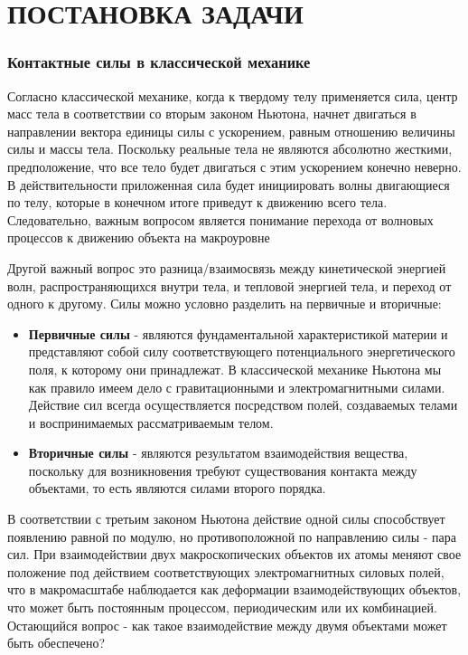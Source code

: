 \newpage
\chapter{ПОСТАНОВКА ЗАДАЧИ}

\subsection*{Контактные силы в классической механике}
Согласно классической механике, когда к твердому телу применяется сила, центр масс тела
в соответствии со вторым законом Ньютона, начнет двигаться в направлении вектора
единицы силы с ускорением, равным отношению величины силы и массы тела.
Поскольку реальные тела не являются абсолютно жесткими, предположение, что все тело
будет двигаться с этим ускорением конечно неверно. В действительности приложенная
сила будет инициировать волны двигающиеся по телу, которые в конечном итоге приведут
к движению всего тела. Следовательно, важным вопросом является понимание перехода от
волновых процессов к движению объекта на макроуровне

Другой важный вопрос это разница/взаимосвязь между кинетической энергией волн,
распространяющихся внутри тела, и тепловой энергией тела, и переход от одного к другому.
Силы можно условно разделить на первичные и вторичные:

\begin{itemize}
\item \textbf{Первичные силы} - являются фундаментальной характеристикой материи и представляют собой силу
соответствующего потенциального энергетического поля, к которому они принадлежат.
В классической механике Ньютона мы как правило имеем дело с гравитационными и
электромагнитными силами. Действие сил всегда осуществляется посредством полей,
создаваемых телами и воспринимаемых рассматриваемым телом.
\item \textbf{Вторичные силы} - являются результатом взаимодействия вещества, поскольку для
возникновения требуют существования контакта между объектами, то есть являются
силами второго порядка.
\end{itemize}
В соответствии с третьим законом Ньютона действие одной силы способствует появлению
равной по модулю, но противоположной по направлению силы - пара сил.
При взаимодействии двух макроскопических объектов их атомы меняют свое положение
под действием соответствующих электромагнитных силовых полей, что в макромасштабе
наблюдается как деформации взаимодействующих объектов, что может быть постоянным
процессом, периодическим или их комбинацией.
Остающийся вопрос - как такое взаимодействие между двумя объектами может быть
обеспечено?

